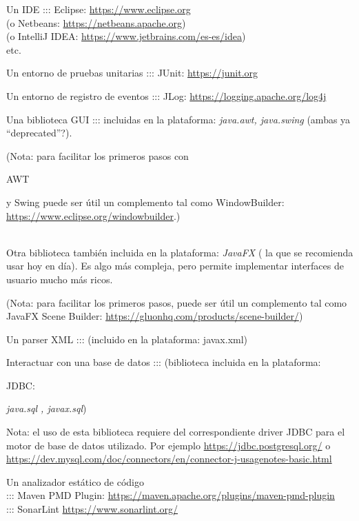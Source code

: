 \documentclass[spanish,12pt,a4paper,final,oneside]{book}
\begin{document}
Un IDE ::: Eclipse: \url{https://www.eclipse.org}
\\(o Netbeans: \url{https://netbeans.apache.org})
\\(o IntelliJ IDEA: \url{https://www.jetbrains.com/es-es/idea})
\\etc.

Un entorno de pruebas unitarias ::: JUnit: \url{https://junit.org}

Un entorno de registro de eventos ::: JLog: \url{https://logging.apache.org/log4j}

Una biblioteca GUI ::: incluidas en la plataforma: \textit{java.awt, java.swing} (ambas ya ``deprecated''?). \begin{footnotesize}(Nota: para facilitar los primeros pasos con \begin{scriptsize}AWT\end{scriptsize} y Swing puede ser útil un complemento tal como WindowBuilder: \url{https://www.eclipse.org/windowbuilder}.)\end{footnotesize} 
\\ Otra biblioteca también incluida en la plataforma: \textit{JavaFX} ( la que se recomienda usar hoy en día). Es algo más compleja, pero permite implementar interfaces de usuario mucho más ricos.  \begin{footnotesize}(Nota: para facilitar los primeros pasos, puede ser útil un complemento tal como JavaFX Scene Builder: \url{https://gluonhq.com/products/scene-builder/})\end{footnotesize} 

Un parser XML ::: (incluido en la plataforma: javax.xml)

Interactuar con una base de datos ::: (biblioteca incluida en la plataforma: \begin{footnotesize}JDBC:\end{footnotesize}  \textit{java.sql , javax.sql}) \begin{footnotesize} Nota: el uso de esta biblioteca requiere del correspondiente driver JDBC para el motor de base de datos utilizado. Por ejemplo \url{https://jdbc.postgresql.org/} o \url{https://dev.mysql.com/doc/connectors/en/connector-j-usagenotes-basic.html}\end{footnotesize}

Un analizador estático de código 
\\::: Maven PMD Plugin: \url{https://maven.apache.org/plugins/maven-pmd-plugin} 
\\::: SonarLint \url{https://www.sonarlint.org/}
\end{document}
